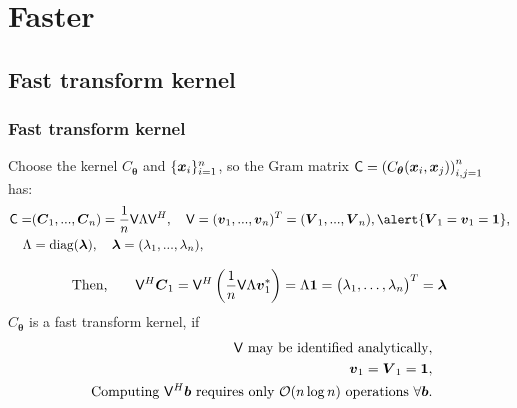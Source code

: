 \documentclass[handout, 10pt,compress,xcolor={usenames,dvipsnames}]{beamer} %
\newcommand{\bm}[1]{\boldsymbol{#1}}
\renewcommand{\mLambda}{\Lambda}
\newcommand{\vC}{\bvec{C}}
\renewcommand{\vtheta}{{\bm{\theta}}}
\newcommand{\pause}{}
\newcommand{\redroundmathbox}[1]{\parbox{\widthof{$#1$\hspace{1em}}}
	{\begin{mdframed}[style=redshade]\centering $#1$ \end{mdframed}}}
\begin{document}
\section{Faster}



\subsection{Fast transform kernel}



\begin{frame}
\frametitle{Fast transform kernel}
\vspace{-4ex}
Choose the kernel $C_{\vtheta}$ and $\{\boldsymbol{x}_i\}_{i=1}^n$, so the Gram matrix $\mC =  \left( C_{\vtheta} (\vx_i,\vx_j) \right)_{i,j=1}^n$ has:
\vspace{-2ex}
\begin{align*}
\mC =& (\vC_1,...,\vC_n)
=  \frac 1n \mV \mLambda \mV^H, \quad
\mV = (\vv_1,...,\vv_n)^T = (\vV_1,...,\vV_n), 
\alert{\vV_1 = \vv_1 = \vone}, 
\\
\mLambda &= \diag (\vlambda), \quad \vlambda = (\lambda_1,...,\lambda_n),
\end{align*}
\pause 
\vspace{-4ex}
\begin{align*}
\text{Then,} \qquad \mV^H \vC_1 = \mV^H \left( \frac 1n \mV \mLambda \vv_1^* \right) =
 \mLambda \vone =
\begin{pmatrix}
\lambda_1, \hdots, \lambda_n
\end{pmatrix}^T = \vlambda
\end{align*}
\vspace{-2ex}
$C_{\vtheta}$ is a fast transform kernel, if 
\begin{subequations} \label{fastcompAssump}
	\begin{align}
	\label{fastcompAssumpA}
	\mathsf{V} \text{ may be identified analytically}, \\
	\label{fastcompAssumpB}
	\boldsymbol{v}_1 = \boldsymbol{V}_1 = \boldsymbol{1}, \\
	\label{fastcompAssumpC}
	\text{ Computing $\mathsf{V}^H \boldsymbol{b}$ requires only $\operatorname{{\mathcal O}}(n \log n)$ operations } \forall \boldsymbol{b}.
	\end{align}

\end{subequations}
\end{frame}
\end{document}
